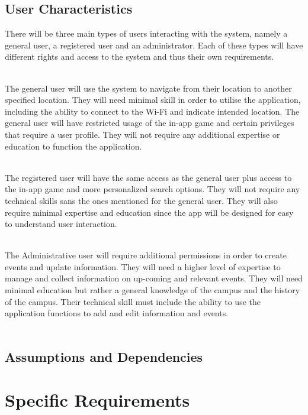 \documentclass{article}
\begin{document}
    	\subsection{User Characteristics}  
{There will be three main types of users interacting with the system, namely a general user, a registered user and an administrator. Each of these types will have different rights and access to the system and thus their own requirements.\\\\}

{The general user will use the system to navigate from their location to another specified location. They will need minimal skill in order to utilise the application, including the ability to connect to the Wi-Fi and indicate intended location. The general user will have restricted usage of the in-app game and certain privileges that require a user profile. They will not require any additional expertise or education to function the application.\\\\}

{The registered user will have the same access as the general user plus access to the in-app game and more personalized search options. They will not require any technical skills sans the ones mentioned for the general user. They will also require minimal expertise and education since the app will be designed for easy to understand user interaction.\\\\}

{The Administrative user will require additional permissions in order to create events and update information. They will need a higher level of expertise to manage and collect information on up-coming and relevant events. They will need minimal education but rather a general knowledge of the campus and the history of the campus. Their technical skill must include the ability to use the application functions to add and edit information and events.\\\\} 
   
    	\subsection{Assumptions and Dependencies}
    	

	\section{Specific Requirements}
   
\end{document}
